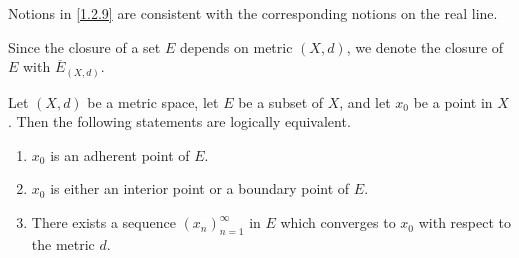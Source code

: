 \begin{note}
  Notions in \cref{1.2.9} are consistent with the corresponding notions on the real line.
\end{note}

\begin{note}
  Since the closure of a set \(E\) depends on metric \((X, d)\), we denote the closure of \(E\) with \(\overline{E}_{(X, d)}\).
\end{note}

\begin{prop}\label{1.2.10}
  Let \((X, d)\) be a metric space, let \(E\) be a subset of \(X\), and let \(x_0\) be a point in \(X\).
  Then the following statements are logically equivalent.
  \begin{enumerate}
    \item \(x_0\) is an adherent point of \(E\).
    \item \(x_0\) is either an interior point or a boundary point of \(E\).
    \item There exists a sequence \((x_n)_{n = 1}^\infty\) in \(E\) which converges to \(x_0\) with respect to the metric \(d\).
  \end{enumerate}
\end{prop}

